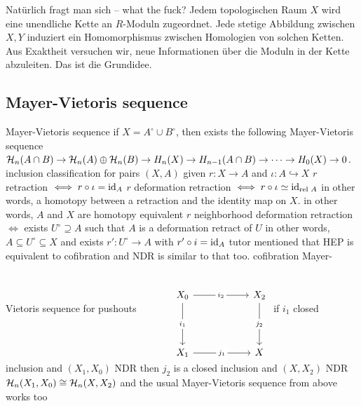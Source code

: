 Natürlich fragt man sich -- what the fuck? Jedem topologischen Raum $X$ wird eine unendliche Kette an $R$-Moduln zugeordnet. Jede stetige Abbildung zwischen $X,Y$ induziert ein Homomorphismus zwischen Homologien von solchen Ketten. Aus Exaktheit versuchen wir, neue Informationen über die Moduln in der Kette abzuleiten. Das ist die Grundidee.

\subsection{Mayer-Vietoris sequence}
\begin{outline}
    \1 Mayer-Vietoris sequence
        \2 if $X=A^\circ\cup B^\circ$, then exists the following Mayer-Vietoris sequence $\mathcal{H}_n(A\cap B) \rightarrow \mathcal{H}_n(A)\oplus\mathcal{H}_n(B)\rightarrow H_n(X)\rightarrow H_{n-1}(A\cap B)\rightarrow \cdots \rightarrow H_0(X)\rightarrow 0$.
    \1 inclusion classification for pairs $(X,A)$
        \2 given $r:X\rightarrow A$ and $\iota: A\hookrightarrow X$
        \2 $r$ retraction $\iff r\circ \iota =\operatorname{id}_A$
        \2 $r$ deformation retraction $\iff r\circ \iota \simeq \operatorname{id}_{\text{rel }A}$
            \3 in other words, a homotopy between a retraction and the identity map on $X$.
            \3 in other words, $A$ and $X$ are homotopy equivalent
        \2 $r$ neighborhood deformation retraction $\iff$ exists $U^\circ\supseteq A$ such that $A$ is a deformation retract of $U$
            \3 in other words, $A\subseteq U^\circ \subseteq X$ and exists $r':U^\circ \rightarrow A$ with $r'\circ i = \operatorname{id}_A$
            \3 tutor mentioned that HEP is equivalent to cofibration and NDR is similar to that too.
        \2 cofibration
    \1 Mayer-Vietoris sequence for pushouts
        \2  $\begin{tikzcd}
        	&& {} \\
        	& {X_0} && {X_2} \\
        	{} \\
        	& {X_1} && X
        	\arrow["{i_1 }"{description}, from=2-2, to=4-2]
        	\arrow["{i_2}"{description}, from=2-2, to=2-4]
        	\arrow["{j_1}"{description}, from=4-2, to=4-4]
        	\arrow["{j_2}"{description}, from=2-4, to=4-4]
            \end{tikzcd}$
        \2 if $i_1$ closed inclusion and $(X_1,X_0)$ NDR  
        \2 then $j_2$ is a closed inclusion and $(X,X_2)$ NDR
        \2 $\mathcal{H}_n(X_1,X_0)\cong \mathcal{H}_n(X,X_2)$
        \2 and the usual Mayer-Vietoris sequence from above works too

\end{outline}


